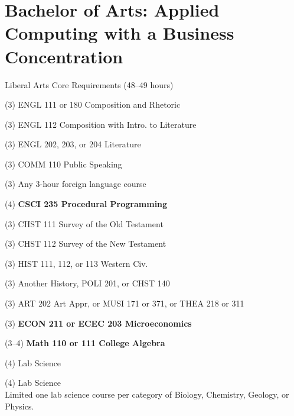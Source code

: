 %
\section*{Bachelor of Arts: Applied Computing with a Business Concentration}

\begin{reqgroup}{Liberal Arts Core Requirements (48--49 hours)}
\begin{checklist}
\begin{minipage}[t]{0.5\linewidth}
	\item (3) ENGL 111 or 180 Composition and Rhetoric
	\item (3) ENGL 112 Composition with Intro\@. to Literature
	\item (3) ENGL 202, 203, or 204 Literature
	\item (3) COMM 110 Public Speaking
	\item (3) Any 3-hour foreign language course
	\item (4) \textbf{CSCI 235  Procedural Programming}
	\item (3) CHST 111  Survey of the Old Testament
	\item (3) CHST 112  Survey of the New Testament
	\item (3) HIST 111, 112, or 113 Western Civ.
\end{minipage}
\begin{minipage}[t]{0.5\linewidth}
	\item (3)	Another History, POLI 201, or CHST 140
	\item (3)	ART 202 Art Appr, or MUSI 171 or 371, or THEA 218 or 311
	\item (3)	\textbf{ECON 211 or ECEC 203 Microeconomics}
	\item (3--4)	\textbf{Math 110 or 111 College Algebra}
	\item (4)	Lab Science
	\item (4)	Lab Science\\Limited one lab science course per category of Biology, Chemistry,
Geology, or Physics.
\end{minipage}
\end{checklist}
\end{reqgroup}


